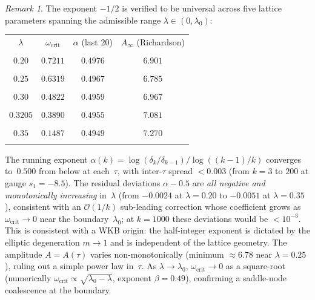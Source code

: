 \documentclass[11pt,a4paper]{article}
\theoremstyle{plain}
\theoremstyle{definition}
\theoremstyle{remark}
\newtheorem{remark}[theorem]{Remark}
\newcommand{\Oo}{\mathcal{O}}
\begin{document}
\begin{remark}
  The exponent $-1/2$ is verified to be universal across five
  lattice parameters spanning the admissible range
  $\lambda \in (0, \lambda_0)$:
  \begin{center}\small
  \begin{tabular}{cccc}
    \toprule
    $\lambda$ & $\omega_{\mathrm{crit}}$ & $\alpha$ (last 20) & $A_\infty$ (Richardson) \\\\
    \midrule
    $0.20$ & $0.7211$ & $0.4976$ & $6.901$ \\\\
    $0.25$ & $0.6319$ & $0.4967$ & $6.785$ \\\\
    $0.30$ & $0.4822$ & $0.4959$ & $6.967$ \\\\
    $0.3205$ & $0.3890$ & $0.4955$ & $7.081$ \\\\
    $0.35$ & $0.1487$ & $0.4949$ & $7.270$ \\\\
    \bottomrule
  \end{tabular}
  \end{center}
  The running exponent $\alpha(k) = \log(\delta_k/\delta_{k-1})
  /\log((k-1)/k)$ converges to~$0.500$ from below at each~$\tau$,
  with inter-$\tau$ spread $< 0.003$ (from $k = 3$ to $200$
  at gauge $s_1 = -8.5$).  The residual deviations
  $\alpha - 0.5$ are \emph{all negative and monotonically increasing}
  in~$\lambda$ (from $-0.0024$ at $\lambda = 0.20$ to $-0.0051$
  at $\lambda = 0.35$), consistent with an $\Oo(1/k)$ sub-leading
  correction whose coefficient grows as $\omega_{\mathrm{crit}} \to 0$
  near the boundary~$\lambda_0$; at $k = 1000$ these deviations
  would be $< 10^{-3}$.
  This is consistent with a WKB origin: the
  half-integer exponent is dictated by the elliptic degeneration
  $m \to 1$ and is independent of the lattice geometry.
  The amplitude $A = A(\tau)$ varies non-monotonically (minimum
  $\approx 6.78$ near $\lambda = 0.25$), ruling out a simple
  power law in~$\tau$.  As $\lambda \to \lambda_0$,
  $\omega_{\mathrm{crit}} \to 0$ as a square-root
  (numerically $\omega_{\mathrm{crit}} \propto
  \sqrt{\lambda_0 - \lambda}$, exponent $\beta = 0.49$),
  confirming a saddle-node coalescence at the boundary.
\end{remark}
\end{document}
